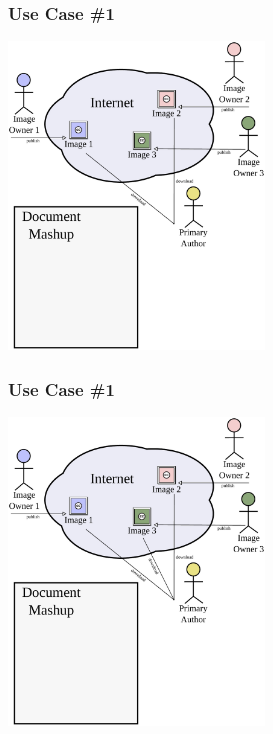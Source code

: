 \documentclass[mathserif,xcolor=dvipsnames,hyperref={bookmarks=true}]{beamer}
\begin{document}
    \begin{frame}[t]
        \frametitle{Use Case \#1}
        \begin{center}
            \includegraphics[width=0.51\textwidth]{../resources/usecases/usecase1/usecase1-step14.pdf}
        \end{center}
    \end{frame}
    \begin{frame}[t]
        \frametitle{Use Case \#1}
        \begin{center}
            \includegraphics[width=0.51\textwidth]{../resources/usecases/usecase1/usecase1-step15.pdf}
        \end{center}
    \end{frame}
\end{document}
